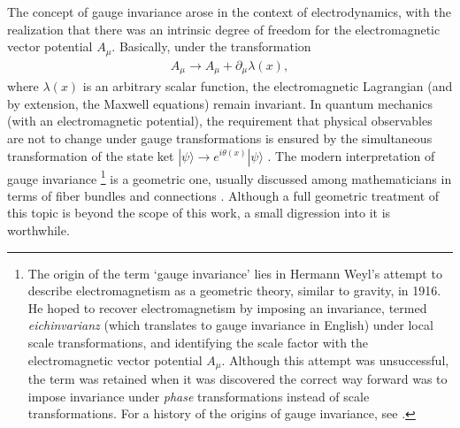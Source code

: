 The concept of gauge invariance arose in the context of electrodynamics, with the realization that there was an intrinsic degree of freedom for the electromagnetic vector potential $A_\mu$. Basically, under the transformation 
\begin{align}
  A_\mu\rightarrow A_\mu + \partial_\mu \lambda(x),
  \label{eq:gauge_transformation}
\end{align}
where $\lambda(x)$ is an arbitrary scalar function, the electromagnetic Lagrangian (and by extension, the Maxwell equations) remain invariant. In quantum mechanics (with an electromagnetic potential), the requirement that physical observables are not to change under gauge transformations is ensured by the simultaneous transformation of the state ket $|\psi\rangle\rightarrow e^{i\theta(x)}|\psi\rangle$ \citep{Sakurai2010}. The modern interpretation of gauge invariance %
%
\footnote{The origin of the term `gauge invariance' lies in Hermann Weyl's attempt to describe electromagnetism as a geometric theory, similar to gravity, in 1916. He hoped to recover electromagnetism by imposing an invariance, termed \emph{eichinvarianz} (which translates to gauge invariance in English)  under local scale transformations, and identifying the scale factor with the electromagnetic vector potential $A_\mu$. Although this attempt was unsuccessful, the term was retained when it was discovered the correct way forward was to impose invariance under \emph{phase} transformations instead of scale transformations. For a history of the origins of gauge invariance, see \citep{Jackson2001}.}%
%
is a geometric one, usually discussed among mathematicians in terms of fiber bundles and connections \citep{Cheng1985}. Although a full geometric treatment of this topic is beyond the scope of this work, a small digression into it is worthwhile.

